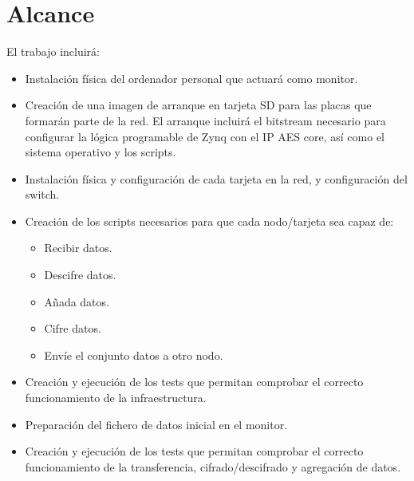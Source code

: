\section{Alcance}
El trabajo incluirá:
\begin{itemize}
	\item Instalación física del ordenador personal que actuará como monitor.
	\item Creación de una imagen de arranque en tarjeta SD para las placas que formarán parte de la red. El arranque incluirá el bitstream necesario para configurar la lógica programable de Zynq con el IP AES core, así como el sistema operativo y los scripts.
	\item Instalación física y configuración de cada tarjeta en la red, y configuración del switch.
	\item Creación de los scripts necesarios para que cada nodo/tarjeta sea capaz de:
	\begin{itemize}
		\item Recibir datos.
		\item Descifre datos.
		\item Añada datos.
		\item Cifre datos.
		\item Envíe el conjunto datos a otro nodo.
	\end{itemize}
	\item Creación y ejecución de los tests que permitan comprobar el correcto funcionamiento de la infraestructura.
	\item Preparación del fichero de datos inicial en el monitor.
	\item Creación y ejecución de los tests que permitan comprobar el correcto funcionamiento de la transferencia, cifrado/descifrado y agregación de datos.
\end{itemize}